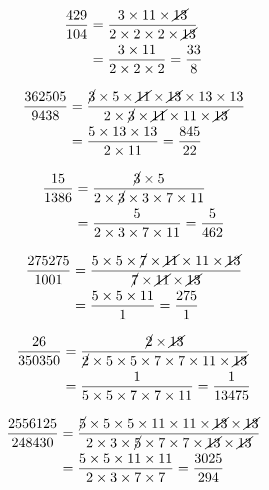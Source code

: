 {{\item\begin{align*}
    \dfrac{429}{104} &=
    \dfrac{3 \times 11 \times \cancel{13}}
    {2 \times 2 \times 2 \times \cancel{13}}\\ &=
    \dfrac{3 \times 11}
    {2 \times 2 \times 2} =
    \dfrac{33}{8}
    \end{align*}

\item\begin{align*}
    \dfrac{362505}{9438} &=
    \dfrac{\cancel{3} \times 5 \times \cancel{11} \times \cancel{13} \times 13 \times 13}
    {2 \times \cancel{3} \times \cancel{11} \times 11 \times \cancel{13}}\\ &=
    \dfrac{5 \times 13 \times 13}
    {2 \times 11} =
    \dfrac{845}{22}
    \end{align*}

\item\begin{align*}
    \dfrac{15}{1386} &=
    \dfrac{\cancel{3} \times 5}
    {2 \times \cancel{3} \times 3 \times 7 \times 11}\\ &=
    \dfrac{5}
    {2 \times 3 \times 7 \times 11} =
    \dfrac{5}{462}
    \end{align*}

\item\begin{align*}
    \dfrac{275275}{1001} &=
    \dfrac{5 \times 5 \times \cancel{7} \times \cancel{11} \times 11 \times \cancel{13}}
    {\cancel{7} \times \cancel{11} \times \cancel{13}}\\ &=
    \dfrac{5 \times 5 \times 11}
    {1} =
    \dfrac{275}{1}
    \end{align*}

\item\begin{align*}
    \dfrac{26}{350350} &=
    \dfrac{\cancel{2} \times \cancel{13}}
    {\cancel{2} \times 5 \times 5 \times 7 \times 7 \times 11 \times \cancel{13}}\\ &=
    \dfrac{1}
    {5 \times 5 \times 7 \times 7 \times 11} =
    \dfrac{1}{13475}
    \end{align*}

\item\begin{align*}
    \dfrac{2556125}{248430} &=
    \dfrac{\cancel{5} \times 5 \times 5 \times 11 \times 11 \times \cancel{13} \times \cancel{13}}
    {2 \times 3 \times \cancel{5} \times 7 \times 7 \times \cancel{13} \times \cancel{13}}\\ &=
    \dfrac{5 \times 5 \times 11 \times 11}
    {2 \times 3 \times 7 \times 7} =
    \dfrac{3025}{294}
    \end{align*}

}}
